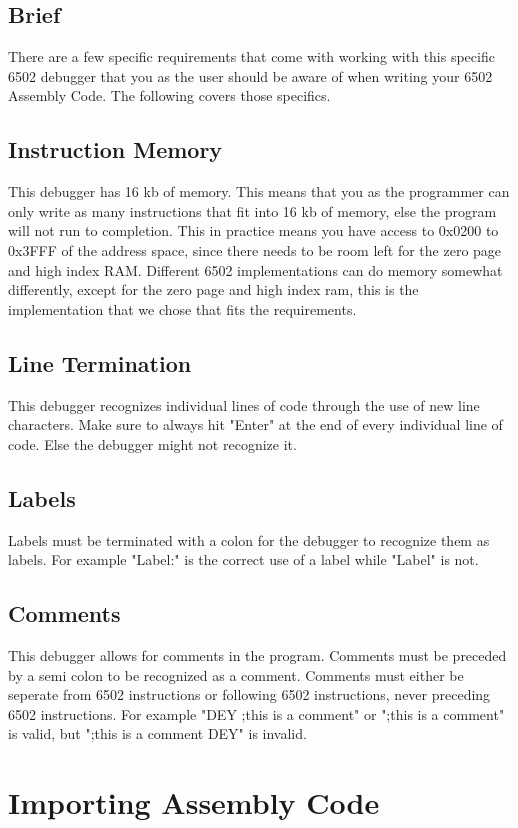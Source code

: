 \documentclass[a3paper, 11pt]{article}
\begin{document}
\subsection{Brief}
There are a few specific requirements that come with working with this specific 6502 debugger that you as the user should be aware of when writing your 6502 Assembly Code. The following covers those specifics.
\subsection{Instruction Memory}
This debugger has 16 kb of memory. This means that you as the programmer can only write as many instructions that fit into 16 kb of memory, else the program will not run to completion. This in practice means you have access to 0x0200 to 0x3FFF of the address space, since there needs to be room left for the zero page and high index RAM. Different 6502 implementations can do memory somewhat differently, except for the zero page and high index ram, this is the implementation that we chose that fits the requirements.
\subsection{Line Termination}
This debugger recognizes individual lines of code through the use of new line characters. Make sure to always hit "Enter" at the end of every individual line of code. Else the debugger might not recognize it.
\subsection{Labels}
Labels must be terminated with a colon for the debugger to recognize them as labels. For example "Label:" is the correct use of a label while "Label" is not. 
\subsection{Comments}
This debugger allows for comments in the program. Comments must be preceded by a semi colon to be recognized as a comment. Comments must either be seperate from 6502 instructions or following 6502 instructions, never preceding 6502 instructions. For example "DEY ;this is a comment" or ";this is a comment" is valid, but ";this is a comment DEY" is invalid.
\pagebreak

\section{Importing Assembly Code}
\end{document}
